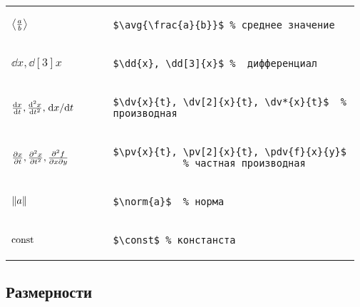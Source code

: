 \noindent
\begin{tabular}{C{0.28\linewidth} C{0.685\linewidth}}
    \vspace{-10pt}$\left\langle {\frac{a}{b}} \right\rangle$ &
        \begin{lstlisting}[style = listtable, gobble = 10]
            $\avg{\frac{a}{b}}$ % среднее значение
        \end{lstlisting} \\
    $\dd{x}, \dd[3]{x}$ &
        \begin{lstlisting}[style = listtable, gobble = 10]
            $\dd{x}, \dd[3]{x}$ %  дифференциал
        \end{lstlisting} \\
    \vspace{-10pt}$\dv{x}{t}, \dv[2]{x}{t}, \dv*{x}{t}$ &
        \begin{lstlisting}[style = listtable, gobble = 10]
            $\dv{x}{t}, \dv[2]{x}{t}, \dv*{x}{t}$  % производная
        \end{lstlisting} \\
    \vspace{-10pt}$\pdv{x}{t}, \pdv[2]{x}{t}, \pdv{f}{x}{y}$ &
        \begin{lstlisting}[style = listtable, gobble = 10]
            $\pv{x}{t}, \pv[2]{x}{t}, \pdv{f}{x}{y}$
            % частная производная
        \end{lstlisting} \\
    $\norm{a}$ &
        \begin{lstlisting}[style = listtable, gobble = 10]
            $\norm{a}$  % норма
        \end{lstlisting} \\
    $\mathrm{const}$ &
        \begin{lstlisting}[style = listtable, gobble = 10]
            $\const$ % констанста
        \end{lstlisting} \\
\end{tabular}



\subsection{Размерности}

\def\arraystretch{-500}

